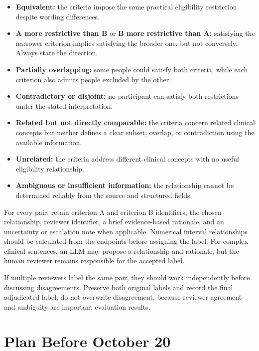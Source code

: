 \documentclass[11pt]{article}
\begin{document}
\begin{itemize}
    \item \textbf{Equivalent:} the criteria impose the same practical eligibility restriction despite wording differences.
    \item \textbf{A more restrictive than B} or \textbf{B more restrictive than A:} satisfying the narrower criterion implies satisfying the broader one, but not conversely. Always state the direction.
    \item \textbf{Partially overlapping:} some people could satisfy both criteria, while each criterion also admits people excluded by the other.
    \item \textbf{Contradictory or disjoint:} no participant can satisfy both restrictions under the stated interpretation.
    \item \textbf{Related but not directly comparable:} the criteria concern related clinical concepts but neither defines a clear subset, overlap, or contradiction using the available information.
    \item \textbf{Unrelated:} the criteria address different clinical concepts with no useful eligibility relationship.
    \item \textbf{Ambiguous or insufficient information:} the relationship cannot be determined reliably from the source and structured fields.
\end{itemize}

For every pair, retain criterion A and criterion B identifiers, the chosen relationship, reviewer identifier, a brief evidence-based rationale, and an uncertainty or escalation note when applicable. Numerical interval relationships should be calculated from the endpoints before assigning the label. For complex clinical sentences, an LLM may propose a relationship and rationale, but the human reviewer remains responsible for the accepted label.

If multiple reviewers label the same pair, they should work independently before discussing disagreements. Preserve both original labels and record the final adjudicated label; do not overwrite disagreement, because reviewer agreement and ambiguity are important evaluation results.

\section{Plan Before October 20}
\end{document}
